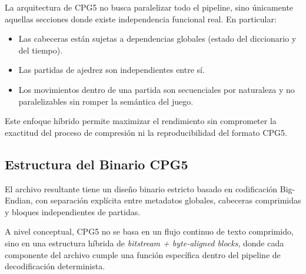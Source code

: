 \documentclass[11pt, letterpaper]{article}
\begin{document}
La arquitectura de CPG5 no busca paralelizar todo el pipeline, sino únicamente aquellas secciones donde existe independencia funcional real. En particular:

\begin{itemize}
\item Las cabeceras están sujetas a dependencias globales (estado del diccionario y del tiempo).
\item Las partidas de ajedrez son independientes entre sí.
\item Los movimientos dentro de una partida son secuenciales por naturaleza y no paralelizables sin romper la semántica del juego.
\end{itemize}

Este enfoque híbrido permite maximizar el rendimiento sin comprometer la exactitud del proceso de compresión ni la reproducibilidad del formato CPG5.


\subsection{Estructura del Binario CPG5}

El archivo resultante tiene un diseño binario estricto basado en codificación Big-Endian, con separación explícita entre metadatos globales, cabeceras comprimidas y bloques independientes de partidas.

A nivel conceptual, CPG5 no se basa en un flujo continuo de texto comprimido, sino en una estructura híbrida de \textit{bitstream + byte-aligned blocks}, donde cada componente del archivo cumple una función específica dentro del pipeline de decodificación determinista.
\end{document}
